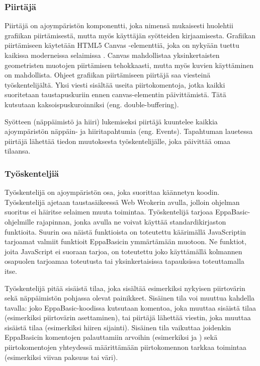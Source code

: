 \subsubsection{Piirtäjä}
Piirtäjä on ajoympäristön komponentti,
joka nimensä mukaisesti huolehtii
grafiikan piirtämisestä,
mutta myös käyttäjän syötteiden kirjaamisesta.
Grafiikan piirtämiseen käytetään
HTML5 Canvas -elementtiä,
joka on nykyään tuettu kaikissa moderneissa
selaimissa \cite{caniuse_canvas}.
Canvas mahdollistaa yksinkertaisten
geometristen muotojen piirtämisen tehokkaasti,
mutta myös kuvien käyttäminen on mahdollista.
Ohjeet grafiikan piirtämiseen piirtäjä
saa viesteinä työskentelijältä.
Yksi viesti sisältää useita piirtokomentoja,
jotka kaikki suoritetaan taustapuskuriin ennen
canvas-elementin päivittämistä.
Tätä kutsutaan kaksoispuskuroinniksi
(eng. double-buffering).

Syötteen (näppäimistö ja hiiri) lukemiseksi
piirtäjä kuuntelee kaikkia ajoympäristön
näp\-päin- ja hiiritapahtumia (eng. Events).
Tapahtuman lauetessa piirtäjä
lähettää tiedon muutoksesta työskentelijälle,
joka päivittää omaa tilaansa.

\subsubsection{Työskenteljiä}
Työskentelijä on ajoympäristön osa,
joka suorittaa käännetyn koodin.
Työskentelijä ajetaan taustasäikeessä
Web Wrokerin avulla, jolloin ohjelman
suoritus ei häiritse selaimen muuta toimintaa.
Työskentelijä tarjoaa EppaBasic-ohjelmille
rajapinnan, jonka avulla ne voivat käyttää
standardikirjaston funktioita.
Suurin osa näistä funktioista on toteutettu
käärimällä JavaScriptin tarjoamat valmiit
funktioit EppaBasicin ymmärtämään muotoon.
Ne funktiot, joita JavaScript ei suoraan tarjoa,
on toteutettu joko käyttämällä kolmannen osapuolen
tarjoamaa toteutusta tai yksinkertaisissa
tapauksissa toteuttamalla itse.

Työskentelijä pitää sisäistä tilaa,
joka sisältää esimerkiksi nykyisen piirtovärin
sekä näppäimistön pohjassa olevat painikkeet.
Sisäinen tila voi muuttua kahdella tavalla:
joko EppaBasic-koodissa kutsutaan komentoa,
joka muuttaa sisäistä tilaa
(esimerkiksi piirtovärin asettaminen),
tai piirtäjä lähettää viestin,
joka muuttaa sisäistä tilaa
(esimerkiksi hiiren sijainti).
Sisäinen tila vaikuttaa joidenkin
EppaBasicin komentojen palauttamiin arvoihin
(esimerkiksi  ja )
sekä piirtokomentojen yhteydessä määrittämään
piirtokomennon tarkkaa toimintaa
(esimerkiksi viivan paksuus tai väri).


